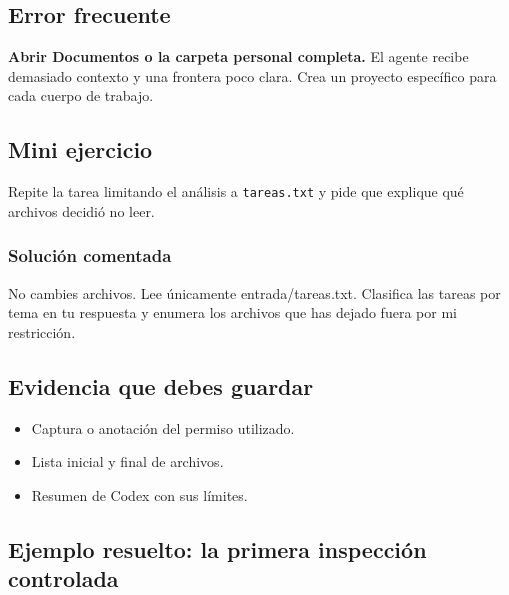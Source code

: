 \documentclass[10pt,a4paper,openany]{book}
\providecommand{\tightlist}{\setlength{\itemsep}{0.18em}\setlength{\parskip}{0pt}}
\newenvironment{Shaded}{}{}
\newcommand{\NormalTok}[1]{#1}
\renewenvironment{Shaded}
  {\begin{tcolorbox}[
    enhanced,
    breakable,
    colback=CodeBg,
    colframe=Border,
    boxrule=0.5pt,
    arc=2mm,
    left=3mm,
    right=3mm,
    top=2.2mm,
    bottom=2.2mm,
    before skip=0.8em,
    after skip=0.9em
  ]}
  {\end{tcolorbox}}
\begin{document}
\subsection{Error frecuente}\label{error-frecuente-3}

\textbf{Abrir Documentos o la carpeta personal completa.} El agente
recibe demasiado contexto y una frontera poco clara. Crea un proyecto
específico para cada cuerpo de trabajo.

\subsection{Mini ejercicio}\label{mini-ejercicio}

Repite la tarea limitando el análisis a \texttt{tareas.txt} y pide que
explique qué archivos decidió no leer.

\subsubsection{Solución comentada}\label{soluciuxf3n-comentada-3}

\begin{Shaded}
\begin{Highlighting}[]
\NormalTok{No cambies archivos. Lee únicamente entrada/tareas.txt. Clasifica las tareas}
\NormalTok{por tema en tu respuesta y enumera los archivos que has dejado fuera por mi}
\NormalTok{restricción.}
\end{Highlighting}
\end{Shaded}

\subsection{Evidencia que debes
guardar}\label{evidencia-que-debes-guardar-3}

\begin{itemize}
\tightlist
\item
  Captura o anotación del permiso utilizado.
\item
  Lista inicial y final de archivos.
\item
  Resumen de Codex con sus límites.
\end{itemize}

\subsection{Ejemplo resuelto: la primera inspección
controlada}\label{ejemplo-resuelto-la-primera-inspecciuxf3n-controlada}
\end{document}
